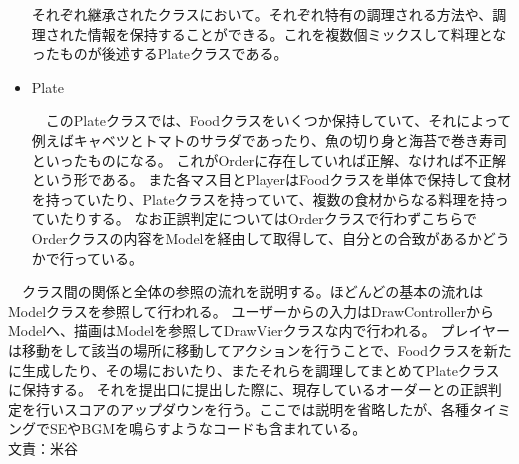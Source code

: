 \documentclass[a4j]{jsarticle} %
\begin{document}
\begin{itemize}
  それぞれ継承されたクラスにおいて。それぞれ特有の調理される方法や、調理された情報を保持することができる。これを複数個ミックスして料理となったものが後述するPlateクラスである。
  \item Plate\par
  　このPlateクラスでは、Foodクラスをいくつか保持していて、それによって例えばキャベツとトマトのサラダであったり、魚の切り身と海苔で巻き寿司といったものになる。
  これがOrderに存在していれば正解、なければ不正解という形である。
  また各マス目とPlayerはFoodクラスを単体で保持して食材を持っていたり、Plateクラスを持っていて、複数の食材からなる料理を持っていたりする。
  なお正誤判定についてはOrderクラスで行わずこちらでOrderクラスの内容をModelを経由して取得して、自分との合致があるかどうかで行っている。
\end{itemize}
　クラス間の関係と全体の参照の流れを説明する。ほどんどの基本の流れはModelクラスを参照して行われる。
ユーザーからの入力はDrawControllerからModelへ、描画はModelを参照してDrawVierクラスな内で行われる。
プレイヤーは移動をして該当の場所に移動してアクションを行うことで、Foodクラスを新たに生成したり、その場においたり、またそれらを調理してまとめてPlateクラスに保持する。
それを提出口に提出した際に、現存しているオーダーとの正誤判定を行いスコアのアップダウンを行う。ここでは説明を省略したが、各種タイミングでSEやBGMを鳴らすようなコードも含まれている。
\\文責：米谷
\end{document}
